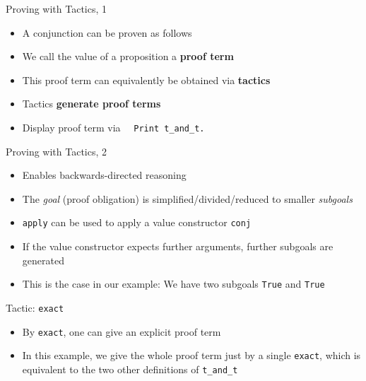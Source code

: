 \begin{frame}[fragile]{Proving with Tactics, 1}
\begin{itemize}
  \item A conjunction can be proven as follows


  \pause

  \item We call the value of a proposition a \textbf{proof term}

  \pause

  \item This proof term can equivalently be obtained via \textbf{tactics}


  \pause

  \item Tactics \textbf{generate proof terms}

  \pause

  \item Display proof term via ~~\lstinline|Print t_and_t.|
\end{itemize}
\end{frame}

\begin{frame}[fragile]{Proving with Tactics, 2}


\begin{itemize}
  \item Enables backwards-directed reasoning
  \pause
  \item The \textit{goal} (proof obligation) is simplified/divided/reduced to smaller \textit{subgoals}
  \pause
  \item \lstinline|apply| can be used to apply a value constructor \lstinline|conj|
  \pause
  \item If the value constructor expects further arguments, further subgoals are generated
  \pause
  \item This is the case in our example: We have two subgoals \lstinline|True| and \lstinline|True|

\end{itemize}
\end{frame}

\begin{frame}[fragile]{Tactic: \lstinline|exact|}

\begin{itemize}
  \item By \lstinline|exact|, one can give an explicit proof term
  \pause
  \item In this example, we give the whole proof term just by a single \lstinline|exact|, which is equivalent to the two other definitions of \lstinline|t_and_t|
\end{itemize}
\end{frame}

